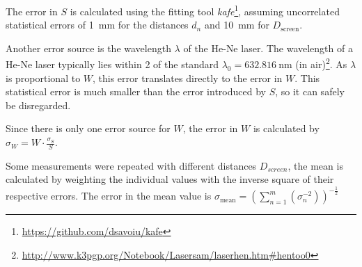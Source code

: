 The error in $S$ is calculated using the fitting tool \textit{kafe}\footnote{\url{https://github.com/dsavoiu/kafe}}, assuming uncorrelated statistical errors of \SI{1}{\mm} for the distances $d_n$ and \SI{10}{\mm} for $D_\text{screen}$.


Another error source is the wavelength $\lambda$ of the He-Ne laser.
The wavelength of a He-Ne laser typically lies within \SI{2}{\ppm} of the standard $\lambda_0 = \SI{632.816}{\nm}$ (in air)\footnote{\url{http://www.k3pgp.org/Notebook/Lasersam/laserhen.htm\#hentoo0}}.
As $\lambda$ is proportional to $W$, this error translates directly to the error in $W$.
This statistical error is much smaller than the error introduced by $S$, so it can safely be disregarded.

Since there is only one error source for $W$, the error in $W$ is calculated by $\sigma_W = W \cdot \frac{\sigma_S}{S}$.

Some measurements were repeated with different distances $D_{screen}$, the mean is calculated by weighting the individual values with the inverse square of their respective errors.
The error in the mean value is $\sigma_\text{mean} = \left(\sum_{n = 1}^m (\sigma_n^{-2})\right)^{-\frac{1}{2}}$
